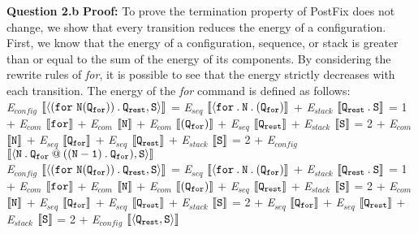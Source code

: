 \documentclass[12pt]{report}
\begin{document}
{\bf Question 2.b} \newline
{\bf Proof:} To prove the termination property of PostFix does not change, we show that every transition reduces the energy of a configuration. First, we know that the energy of a configuration, sequence, or stack is greater than or equal to the sum of the energy of its components. By considering the rewrite rules of {\em for}, it is possible to see that the energy strictly decreases with each transition. The energy of the {\em for} command is defined as follows: \\

{\em E$_{config}$} $\llbracket {\tt \langle (for\ N(Q_{for})) \:.\: Q_{rest}, S \rangle } \rrbracket$ \newline
= {\em E$_{seq}$} $\llbracket {\tt \langle for \:.\: N \:.\: (Q_{for})} \rrbracket$ + {\em E$_{stack}$} $\llbracket {\tt Q_{rest} \:.\: S} \rrbracket$ \newline
= 1 + {\em E$_{com}$} $\llbracket {\tt for} \rrbracket$ + {\em E$_{com}$} $\llbracket {\tt N} \rrbracket$ + {\em E$_{com}$} $\llbracket {\tt (Q_{for})} \rrbracket$ + {\em E$_{seq}$} $\llbracket {\tt Q_{rest}} \rrbracket$ + {\em E$_{stack}$} $\llbracket {\tt S} \rrbracket$ \newline
= 2 + {\em E$_{com}$} $\llbracket {\tt N} \rrbracket$ + {\em E$_{seq}$} $\llbracket {\tt Q_{for}} \rrbracket$ + {\em E$_{seq}$} $\llbracket {\tt Q_{rest}} \rrbracket$ + {\em E$_{stack}$} $\llbracket {\tt S} \rrbracket$ \newline
= 2 + {\em E$_{config}$} $\llbracket \langle {\tt N \:.\: Q_{for} \:@\: ((N-1) \:.\: Q_{for}), S} \rangle \rrbracket$ \\

{\em E$_{config}$} $\llbracket {\tt \langle (for\ N(Q_{for})) \:.\: Q_{rest}, S \rangle } \rrbracket$ \newline
= {\em E$_{seq}$} $\llbracket {\tt \langle for \:.\: N \:.\: (Q_{for})} \rrbracket$ + {\em E$_{stack}$} $\llbracket {\tt Q_{rest} \:.\: S} \rrbracket$ \newline
= 1 + {\em E$_{com}$} $\llbracket {\tt for} \rrbracket$ + {\em E$_{com}$} $\llbracket {\tt N} \rrbracket$ + {\em E$_{com}$} $\llbracket {\tt (Q_{for})} \rrbracket$ + {\em E$_{seq}$} $\llbracket {\tt Q_{rest}} \rrbracket$ + {\em E$_{stack}$} $\llbracket {\tt S} \rrbracket$ \newline
= 2 + {\em E$_{com}$} $\llbracket {\tt N} \rrbracket$ + {\em E$_{seq}$} $\llbracket {\tt Q_{for}} \rrbracket$ + {\em E$_{seq}$} $\llbracket {\tt Q_{rest}} \rrbracket$ + {\em E$_{stack}$} $\llbracket {\tt S} \rrbracket$ \newline
= 2 + {\em E$_{seq}$} $\llbracket {\tt Q_{for}} \rrbracket$ + {\em E$_{seq}$} $\llbracket {\tt Q_{rest}} \rrbracket$ + {\em E$_{stack}$} $\llbracket {\tt S} \rrbracket$ \newline
= 2 + {\em E$_{config}$} $\llbracket \langle {\tt Q_{rest}, S} \rangle \rrbracket$ \newline
\end{document}
